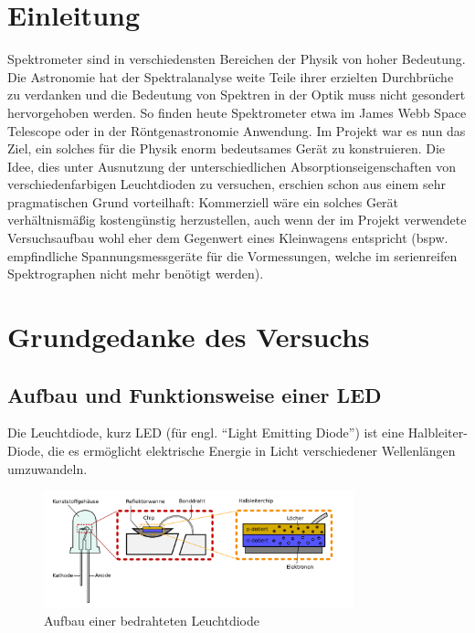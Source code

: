 \documentclass[11pt]{scrartcl}
\begin{document}
\section{Einleitung} %
Spektrometer sind in verschiedensten Bereichen der Physik von hoher Bedeutung. Die Astronomie hat der Spektralanalyse weite Teile ihrer erzielten Durchbrüche zu verdanken und die Bedeutung von Spektren in der Optik muss nicht gesondert hervorgehoben werden. So finden heute  Spektrometer etwa im James Webb Space Telescope oder in der Röntgenastronomie Anwendung. Im Projekt war es nun das Ziel, ein solches für die Physik enorm bedeutsames Gerät zu konstruieren. Die Idee, dies unter Ausnutzung der unterschiedlichen Absorptionseigenschaften von verschiedenfarbigen Leuchtdioden zu versuchen, erschien schon aus einem sehr pragmatischen Grund vorteilhaft: Kommerziell wäre ein solches Gerät verhältnismäßig kostengünstig herzustellen, auch wenn der im Projekt verwendete Versuchsaufbau wohl eher dem Gegenwert eines Kleinwagens entspricht (bspw. empfindliche Spannungsmessgeräte für die Vormessungen, welche im serienreifen Spektrographen nicht mehr benötigt werden).



\section{Grundgedanke des Versuchs}


\subsection{Aufbau und Funktionsweise einer LED}
Die Leuchtdiode, kurz LED (für engl. "`Light Emitting Diode"') ist eine Halbleiter-Diode, die es ermöglicht elektrische Energie in Licht verschiedener Wellenlängen umzuwandeln.

\begin{figure}[ht]
\begin{center}
\includegraphics[width=0.8\textwidth]{ledaufbau.png}
\end{center}
\vspace{-1.5\baselineskip}
\caption{Aufbau einer bedrahteten Leuchtdiode}
\label{LED-Aufbau}
\end{figure}
\end{document}
